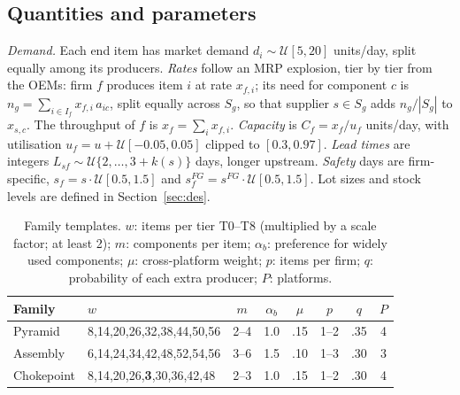 \documentclass{ifacconf}
\begin{document}
\subsection{Quantities and parameters}
\label{sec:quant}
\emph{Demand.} Each end item has market demand $d_i\sim\mathcal{U}[5,20]$ units/day, split equally among its producers. \emph{Rates} follow an MRP explosion, tier by tier from the OEMs: firm $f$ produces item $i$ at rate $x_{f,i}$; its need for component $c$ is $n_g=\sum_{i\in I_f}x_{f,i}\,a_{ic}$, split equally across $S_g$, so that supplier $s\in S_g$ adds $n_g/|S_g|$ to $x_{s,c}$. The throughput of $f$ is $x_f=\sum_i x_{f,i}$. \emph{Capacity} is $C_f=x_f/u_f$ units/day, with utilisation $u_f=u+\mathcal{U}[-0.05,0.05]$ clipped to $[0.3,0.97]$. \emph{Lead times} are integers $L_{sf}\sim\mathcal{U}\{2,\dots,3+k(s)\}$ days, longer upstream. \emph{Safety} days are firm-specific, $s_f=s\cdot\mathcal{U}[0.5,1.5]$ and $s^{FG}_f=s^{FG}\cdot\mathcal{U}[0.5,1.5]$. Lot sizes and stock levels are defined in Section~\ref{sec:des}.

\begin{table}[t]
\caption{Family templates. $w$: items per tier T0--T8 (multiplied by a scale factor; at least 2); $m$: components per item; $\alpha_b$: preference for widely used components; $\mu$: cross-platform weight; $p$: items per firm; $q$: probability of each extra producer; $P$: platforms.}
\label{tab:families}
\centering\footnotesize
\setlength{\tabcolsep}{3pt}
\begin{tabular}{lp{3.2cm}cccccc}
\toprule
Family & $w$ & $m$ & $\alpha_b$ & $\mu$ & $p$ & $q$ & $P$ \\
\midrule
Pyramid & 8,14,20,26,32,38,44,50,56 & 2--4 & 1.0 & .15 & 1--2 & .35 & 4 \\
Assembly & 6,14,24,34,42,48,52,54,56 & 3--6 & 1.5 & .10 & 1--3 & .30 & 3 \\
Chokepoint & 8,14,20,26,\textbf{3},30,36,42,48 & 2--3 & 1.0 & .15 & 1--2 & .30 & 4 \\
\bottomrule
\end{tabular}
\end{table}
\end{document}
